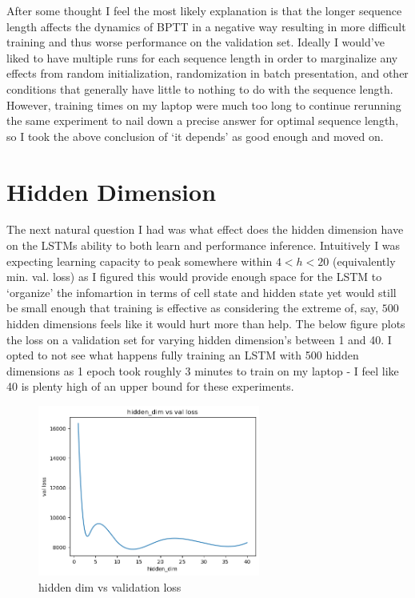 \documentclass[12pt, twoside]{report}
\begin{document}
After some thought I feel the most likely explanation is that the longer sequence length affects the dynamics
of BPTT in a negative way resulting in more difficult training and thus worse performance on the validation set.
Ideally I would've liked to have multiple runs for each sequence length in order to marginalize any
effects from random initialization, randomization in batch presentation, and other conditions that generally
have little to nothing to do with the sequence length. However, training times on my laptop were much too long
to continue rerunning the same experiment to nail down a precise answer for optimal sequence length, so I took
the above conclusion of `it depends' as good enough and moved on.

\section{Hidden Dimension}

The next natural question I had was what effect does the hidden dimension have on the LSTMs
ability to both learn and performance inference. Intuitively I was expecting learning capacity to peak 
somewhere within $4 < h < 20$ (equivalently min. val. loss) as I figured this would provide enough space 
for the LSTM to `organize'  the infomartion in terms of cell state and hidden state yet would still be small 
enough that training is effective as considering the extreme of, say, $500$ hidden dimensions feels 
like it would hurt more than help.
The below figure plots the loss on a validation set for varying hidden dimension's between 1 and 40.
I opted to not see what happens fully training an LSTM with 500 hidden dimensions as 1 epoch took roughly 3 
minutes to train on my laptop - I feel like 40 is plenty high of an upper bound for these experiments.

\begin{figure}[H]
    \centering
    \includegraphics[width=0.65\textwidth]{figures/hidden dim vs val loss.png}
    \caption*{hidden dim vs validation loss}
\end{figure}
\end{document}
